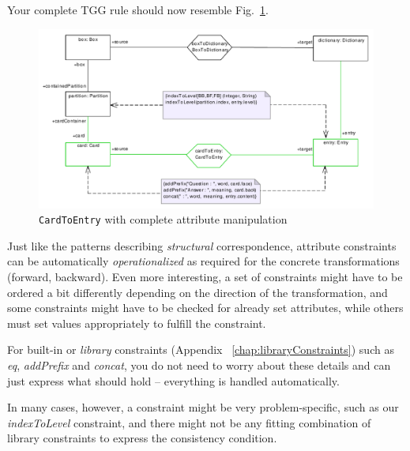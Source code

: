Your complete TGG rule should now resemble Fig.~\ref{fig:cardtoentry_complete}.
\begin{figure}[htbp]
\begin{center}
  \includegraphics[width=\textwidth]{pics/tggBilder/tggRule/tgg21}
  \caption{\texttt{CardToEntry} with complete attribute manipulation}  
  \label{fig:cardtoentry_complete}
\end{center}
\end{figure}

Just like the patterns describing \emph{structural} correspondence,  attribute constraints can be automatically \emph{operationalized} as required for the concrete transformations (forward, backward).
Even more interesting, a set of constraints might have to be ordered a bit differently depending on the direction of the transformation, and some constraints might have to be checked for already set attributes, while others must set values appropriately to fulfill the constraint.

For built-in or \emph{library} constraints (Appendix
~\ref{chap:libraryConstraints}) such as \emph{eq}, \emph{addPrefix} and
\emph{concat}, you do not need to worry about these details and can just express what should hold -- everything is handled automatically.

In many cases, however, a constraint might be very problem-specific, such as our \emph{indexToLevel} constraint, and there might not be any fitting combination of library constraints to express the consistency condition.

